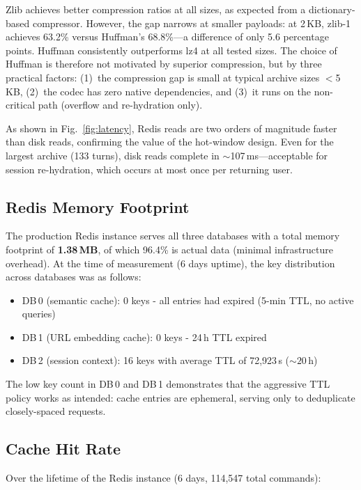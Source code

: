 \documentclass[conference]{IEEEtran}
\begin{document}
Zlib achieves better compression ratios at all sizes, as expected from a dictionary-based compressor. However, the gap narrows at smaller payloads: at 2\,KB, zlib-1 achieves 63.2\% versus Huffman's 68.8\%---a difference of only 5.6 percentage points. Huffman consistently outperforms lz4 at all tested sizes. The choice of Huffman is therefore not motivated by superior compression, but by three practical factors: (1)~the compression gap is small at typical archive sizes $<$5\,KB, (2)~the codec has zero native dependencies, and (3)~it runs on the non-critical path (overflow and re-hydration only).

As shown in Fig.~\ref{fig:latency}, Redis reads are two orders of magnitude faster than disk reads, confirming the value of the hot-window design. Even for the largest archive (133 turns), disk reads complete in ${\sim}$107\,ms---acceptable for session re-hydration, which occurs at most once per returning user.

\subsection{Redis Memory Footprint}

The production Redis instance serves all three databases with a total memory footprint of \textbf{1.38\,MB}, of which 96.4\% is actual data (minimal infrastructure overhead). At the time of measurement (6 days uptime), the key distribution across databases was as follows:

\begin{itemize}
\item DB\,0 (semantic cache): 0 keys - all entries had expired (5-min TTL, no active queries)
\item DB\,1 (URL embedding cache): 0 keys - 24\,h TTL expired
\item DB\,2 (session context): 16 keys with average TTL of 72{,}923\,s (${\sim}20$\,h)
\end{itemize}

The low key count in DB\,0 and DB\,1 demonstrates that the aggressive TTL policy works as intended: cache entries are ephemeral, serving only to deduplicate closely-spaced requests.

\subsection{Cache Hit Rate}

Over the lifetime of the Redis instance (6 days, 114{,}547 total commands):
\end{document}
